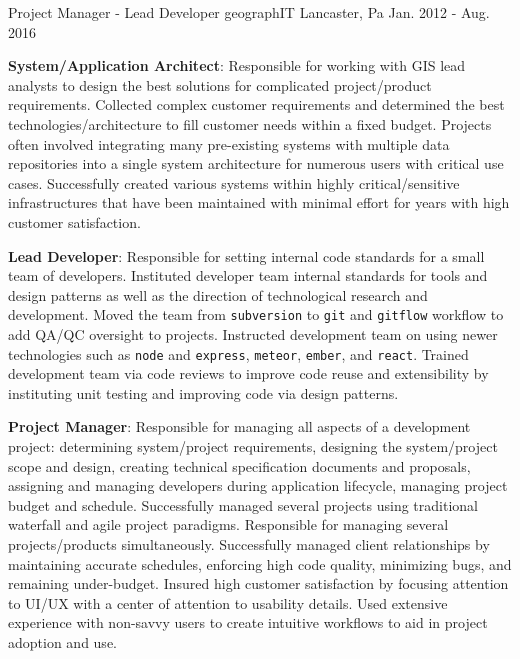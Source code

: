 \begin{cventries}
  \cventry
    {Project Manager - Lead Developer}
    {geographIT}
    {Lancaster, Pa}
    {Jan. 2012 - Aug. 2016}
    {
      \begin{cvitems}
        \item{\textbf{System/Application Architect}: Responsible for working with GIS lead analysts to design the best solutions for complicated project/product requirements. Collected complex customer requirements and determined the best technologies/architecture to fill customer needs within a fixed budget.  Projects often involved integrating many pre-existing systems with multiple data repositories into a single system architecture for numerous users with critical use cases. Successfully created various systems within highly critical/sensitive infrastructures that have been maintained with minimal effort for years with high customer satisfaction. }
        \bigskip
        \item{\textbf{Lead Developer}: Responsible for setting internal code standards for a small team of developers.  Instituted developer team internal standards for tools and design patterns as well as the direction of technological research and development.  Moved the team from \texttt{subversion} to \texttt{git} and \texttt{gitflow} workflow to add QA/QC oversight to projects.  Instructed development team on using newer technologies such as \texttt{node} and \texttt{express}, \texttt{meteor}, \texttt{ember}, and \texttt{react}.  Trained development team via code reviews to improve code reuse and extensibility by instituting unit testing and improving code via design patterns. }
        \bigskip
        \item{\textbf{Project Manager}: Responsible for managing all aspects of a development project: determining system/project requirements, designing the system/project scope and design, creating technical specification documents and proposals, assigning and managing developers during application lifecycle, managing project budget and schedule.  Successfully managed several projects using traditional waterfall and agile project paradigms.  Responsible for managing several projects/products simultaneously.  Successfully managed client relationships by maintaining accurate schedules, enforcing high code quality, minimizing bugs, and remaining under-budget. Insured high customer satisfaction by focusing attention to UI/UX with a center of attention to usability details.  Used extensive experience with non-savvy users to create intuitive workflows to aid in project adoption and use. }
      \end{cvitems}
}
\end{cventries}
